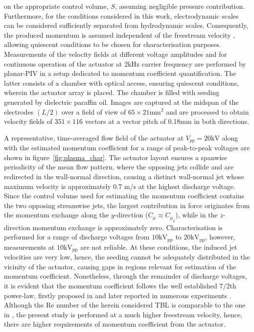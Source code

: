 on the appropriate control volume, $S$, assuming negligible pressure contribution. Furthermore, for the conditions considered in this work, electrodynamic scales can be considered sufficiently separated from hydrodynamic scales. Consequently, the produced momentum is assumed independent of the freestream velocity \citep{Pereira2014external}, allowing quiescent conditions to be chosen for characterisation purposes. Measurements of the velocity fields at different voltage amplitudes and for continuous operation of the actuator at 2kHz carrier frequency are performed by planar-PIV in a setup dedicated to momentum coefficient quantification. The latter consists of a chamber with optical access, ensuring quiescent conditions, wherein the actuator array is placed. The chamber is filled with seeding generated by dielectric paraffin oil. Images are captured at the midspan of the electrodes $(L/2)$ over a field of view of $65\times21\mathrm{mm}^2$ and are processed to obtain velocity fields of $351\times116$ vectors at a vector pitch of 0.18mm in both directions.

A representative, time-averaged flow field of the actuator at $V_{pp} = 20\mathrm{kV}$ along with the estimated momentum coefficient for a range of peak-to-peak voltages are shown in figure~\ref{fig:plasma_char}. The actuator layout ensures a spanwise periodicity of the mean flow pattern, where the opposing jets collide and are redirected in the wall-normal direction, causing a distinct wall-normal jet whose maximum velocity is approximately 0.7 m/s at the highest discharge voltage. Since the control volume used for estimating the momentum coefficient contains the two opposing streamwise jets, the largest contribution in force originates from the momentum exchange along the $y$-direction ($C_{\mu} \approx C_{\mu_y}$), while in the $z$-direction momentum exchange is approximately zero. Characterisation is performed for a range of discharge voltages from $10\mathrm{kV_{pp}}$ to $20\mathrm{kV_{pp}}$, however, measurements at $10\mathrm{kV_{pp}}$ are not reliable. At these conditions, the induced jet velocities are very low, hence, the seeding cannot be adequately distributed in the vicinity of the actuator, causing gaps in regions relevant for estimation of the momentum coefficient. Nonetheless, through the remainder of discharge voltages, it is evident that the momentum coefficient follows the well established $7/2$th power-law, firstly proposed in \citet{Enloe2004} and later reported in numerous experiments \citep{thomas2009dbdopt,Mertz2011}.%
Although the $\mathrm{Re}$ number of the herein considered TBL is comparable to the one in \citet{cheng_wong_hussain_schroder_zhou_2021}, the present study is performed at a much higher freestream velocity, hence, there are higher requirements of momentum coefficient from the actuator.

